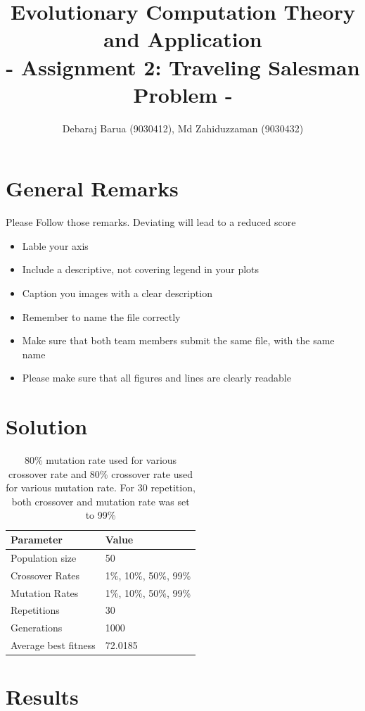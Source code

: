 \documentclass[a4paper, 12pt]{article}
\title{Evolutionary Computation Theory and Application  \\
				- Assignment 2: Traveling Salesman Problem -}
\author{Debaraj Barua (9030412), Md Zahiduzzaman (9030432)}
\date{}
\begin{document}
\maketitle

\section{General Remarks }

Please Follow those remarks. Deviating will lead to a reduced score

\begin{itemize}
	\item Lable your axis 
	\item Include a descriptive, not covering legend in your plots
	\item Caption you images with a clear description
	\item Remember to name the file correctly
	\item Make sure that both team members submit the same file, with the same name
	\item Please make sure that all figures and lines are clearly readable
\end{itemize}

\section{Solution}

\begin{table} [h!]
	  \centering
\begin{tabular}{|l|l|}
\hline
\textbf{Parameter} & \textbf{Value}   \\
\hline
Population size & 50 \\
\hline
Crossover Rates &  1\%, 10\%, 50\%, 99\% \\
\hline
Mutation Rates & 1\%, 10\%, 50\%, 99\% \\
\hline
Repetitions & 30 \\
\hline
Generations & 1000 \\
\hline
Average best fitness		 & 72.0185 \\
\hline
\end{tabular}
\caption{80\% mutation rate used for various crossover rate and 80\% crossover rate used for various mutation rate. For 30 repetition, both crossover and mutation rate was set to 99\% }
\label{table:defparams}
\end{table}

\newpage
\section{Results}
\end{document}
